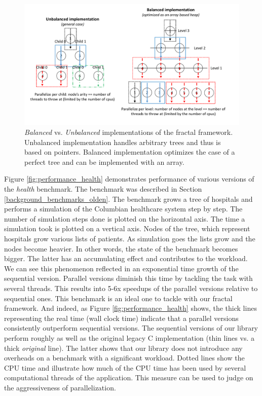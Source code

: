 \begin{figure}[!htb]
\includegraphics[width=1.0\textwidth]{images/balanced_vs_unbalanced.pdf}
\caption{\textit{Balanced} vs. \textit{Unbalanced} implementations of the fractal framework. Unbalanced implementation handles arbitrary trees and thus is based on pointers. Balanced implementation optimizes the case of a perfect tree and can be implemented with an array.}
\label{fig:balanced_vs_unbalanced}
\end{figure}\newline\null
\quad Figure \ref{fig:performance_health} demonstrates performance of various versions of the \textit{health} benchmark. The benchmark was described in Section \ref{background_benchmarks_olden}. The benchmark grows a tree of hospitals and performs a simulation of the Columbian healthcare system step by step. The number of simulation steps done is plotted on the horizontal axis. The time a simulation took is plotted on a vertical axis. Nodes of the tree, which represent hospitals grow various lists of patients. As simulation goes the lists grow and the nodes become heavier. In other words, the state of the benchmark becomes bigger. The latter has an accumulating effect and contributes to the workload. We can see this phenomenon reflected in an exponential time growth of the sequential version. Parallel versions diminish this time by tackling the task with several threads. This results into 5-6x speedups of the parallel versions relative to sequential ones. This benchmark is an ideal one to tackle with our fractal framework. And indeed, as Figure \ref{fig:performance_health} shows, the thick lines representing the real time (wall clock time) indicate that a parallel versions consistently outperform sequential versions. The sequential versions of our library perform roughly as well as the original legacy C implementation (thin lines vs. a thick \textit{original} line). The latter shows that our library does not introduce any overheads on a benchmark with a significant workload. Dotted lines show the CPU time and illustrate how much of the CPU time has been used by several computational threads of the application. This measure can be used to judge on the aggressiveness of parallelization. 
